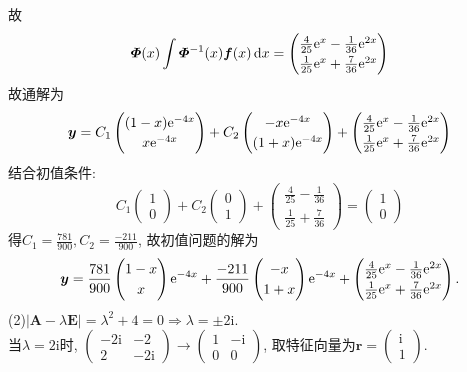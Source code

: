 \documentclass[titlepage,11pt,a4paper,twoside]{report}
\makeatletter
\newcommand\diff{\,\mathrm{d}}
\newcommand\e{\mathrm{e}}
\newcommand\ii{\mathrm{i}}
\newcommand\bmitPhi{\bm{\varPhi}}
\newenvironment{solve}{\par
	\pushQED{\qed}%
	\normalfont \topsep1\p@\@plus6\p@\relax
	\trivlist
	\item\relax
	{\hspace*{\parindent}{\heiti 解}\@addpunct{:}}\hspace\labelsep\ignorespaces
}{%
	\popQED\endtrivlist\@endpefalse
}
\makeatother
\begin{document}
\begin{solve}
故
\[\bmitPhi(x)\int\bmitPhi^{-1}(x)\bm{f}(x)\diff x=
\renewcommand\arraystretch{1.2}\begin{pmatrix}\frac{4}{25}\e^x-\frac{1}{36}\e^{2x}\\\frac{1}{25}\e^x+\frac{7}{36}\e^{2x}\end{pmatrix}\]
故通解为
\[\bm{y}=C_1\begin{pmatrix}(1-x)\e^{-4x}\\x\e^{-4x}\end{pmatrix}+C_2\begin{pmatrix}-x\e^{-4x}\\(1+x)\e^{-4x}\end{pmatrix}+\renewcommand\arraystretch{1.2}\begin{pmatrix}\frac{4}{25}\e^x-\frac{1}{36}\e^{2x}\\\frac{1}{25}\e^x+\frac{7}{36}\e^{2x}\end{pmatrix}\]
结合初值条件:
\[C_1\begin{pmatrix}1\\0\end{pmatrix}+C_2\begin{pmatrix}0\\1\end{pmatrix}+\begin{pmatrix}\frac{4}{25}-\frac{1}{36}\\\frac{1}{25}+\frac{7}{36}\end{pmatrix}=\begin{pmatrix}1\\0\end{pmatrix}\]
得$C_1=\frac{781}{900},C_2=\frac{-211}{900}$, 故初值问题的解为
\[\bm{y}=\frac{781}{900}\begin{pmatrix}1-x\\x\end{pmatrix}\e^{-4x}+\frac{-211}{900}\begin{pmatrix}-x\\1+x\end{pmatrix}\e^{-4x}+\renewcommand\arraystretch{1.2}
\begin{pmatrix}\frac{4}{25}\e^x-\frac{1}{36}\e^{2x}\\\frac{1}{25}\e^x+\frac{7}{36}\e^{2x}\end{pmatrix}.\]
(2)$|\bm{A}-\lambda\bm{E}|=\lambda^2+4=0\Rightarrow\lambda=\pm2\ii$.\\
当$\lambda=2\ii$时, $\begin{pmatrix}-2\ii&-2\\2&-2\ii\end{pmatrix}\to\begin{pmatrix}1&-\ii\\0&0\end{pmatrix}$, 取特征向量为$\bm{r}=\begin{pmatrix}\ii\\1\end{pmatrix}$.\\

\end{solve}
\end{document}
